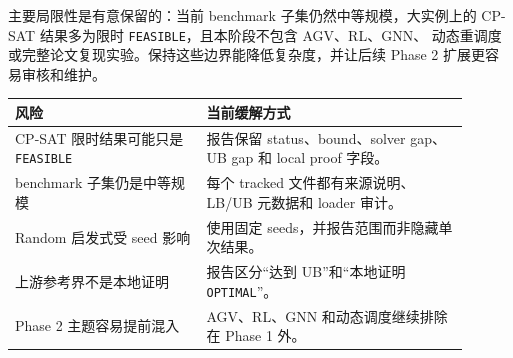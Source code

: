 ﻿\documentclass[11pt]{ctexart}
\begin{document}
主要局限性是有意保留的：当前 benchmark 子集仍然中等规模，大实例上的
CP-SAT 结果多为限时 \texttt{FEASIBLE}，且本阶段不包含 AGV、RL、GNN、
动态重调度或完整论文复现实验。保持这些边界能降低复杂度，并让后续
Phase 2 扩展更容易审核和维护。

\begin{table}[h]
\centering
\begin{tabular}{p{0.38\linewidth}p{0.52\linewidth}}
\toprule
风险 & 当前缓解方式 \\
\midrule
CP-SAT 限时结果可能只是 \texttt{FEASIBLE} &
报告保留 status、bound、solver gap、UB gap 和 local proof 字段。 \\
benchmark 子集仍是中等规模 &
每个 tracked 文件都有来源说明、LB/UB 元数据和 loader 审计。 \\
Random 启发式受 seed 影响 &
使用固定 seeds，并报告范围而非隐藏单次结果。 \\
上游参考界不是本地证明 &
报告区分“达到 UB”和“本地证明 \texttt{OPTIMAL}”。 \\
Phase 2 主题容易提前混入 &
AGV、RL、GNN 和动态调度继续排除在 Phase 1 外。 \\
\bottomrule
\end{tabular}
\end{table}
\end{document}
